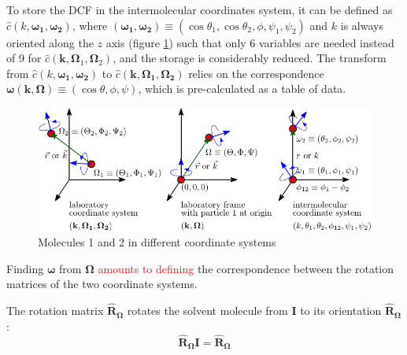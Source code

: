 To store the \acs{DCF} in the intermolecular coordinates system,
it can be defined as $\hat{c}(k,\boldsymbol{\omega_{1}},\boldsymbol{\omega_{2}})$,
where $(\boldsymbol{\omega_{1}},\boldsymbol{\omega_{2}})\equiv(\cos\theta_{1},\cos\theta_{2},\phi,\psi_{1},\psi_{2})$
and $k$ is always oriented along the $z$ axis (figure \ref{fig:coordinate_systems})
such that only 6 variables are needed instead of 9 for $\hat{c}(\mathbf{k},\mathbf{\Omega}_{1},\mathbf{\Omega}_{2})$,
and the storage is considerably reduced. The transform from $\hat{c}(k,\boldsymbol{\omega_{1}},\boldsymbol{\omega_{2}})$
to $\hat{c}(\mathbf{k},\mathbf{\Omega_{1}},\mathbf{\Omega_{2}})$
relies on the correspondence $\boldsymbol{\omega}(\mathbf{k},\mathbf{\Omega})\equiv(\cos\theta,\phi,\psi)$,
which is pre-calculated as a table of data.

\begin{figure}[h]
\begin{centering}
\includegraphics{_figure/coordinate_system}
\par\end{centering}
\caption{Molecules 1 and 2 in different coordinate systems\foreignlanguage{english}{\label{fig:coordinate_systems}}}
\end{figure}

Finding $\boldsymbol{\omega}$ from $\mathbf{\Omega}$ \textcolor{red}{amounts
to defining} the correspondence between the rotation matrices of the
two coordinate systems. 

The rotation matrix $\mathbf{\hat{R}}_{\mathbf{\Omega}}$ rotates
the solvent molecule from $\mathbf{I}$ to its orientation $\mathbf{\hat{R}}_{\mathbf{\Omega}}$:
\begin{equation}
\mathbf{\hat{R}}_{\mathbf{\Omega}}\mathbf{I}=\mathbf{\hat{R}}_{\mathbf{\Omega}}
\end{equation}


